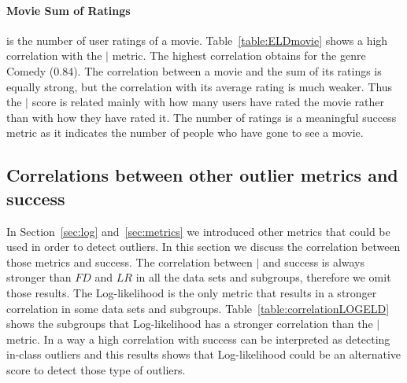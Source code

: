 {	\paragraph{Movie Sum of Ratings} is the number of user ratings of a movie. Table~\ref{table:ELDmovie} shows a high correlation with the $\mid$ metric. The highest correlation obtains for the genre Comedy (0.84). 
	The correlation between a movie and the sum of its ratings is equally strong, but the correlation with its average rating is much weaker. Thus the $\mid$ score is related mainly with how many users have rated the movie rather than with how they have rated it. The number of ratings is a meaningful success metric as it indicates the number of people who have gone to see a movie.  
	





\subsection{Correlations between other outlier metrics and success} \label{sec:corr-others}
In Section~\ref{sec:log} and~\ref{sec:metrics} we introduced other metrics that could be used in order to detect outliers. In this section we discuss the correlation between those metrics and success. The correlation between $\mid$ and success is always stronger than $\textit{FD}$ and $\textit{LR}$ in all the data sets and subgroups, therefore we omit those results. The Log-likelihood is the only metric that results in a stronger correlation in some data sets and subgroups. Table~\ref{table:correlationLOGELD} shows the subgroups that Log-likelihood has a stronger correlation than the $\mid$ metric. 
In a way a high correlation with success can be interpreted as detecting in-class outliers and this results shows that Log-likelihood could be an alternative score to detect those type of outliers.
		\begin{table}


\end{table}}
